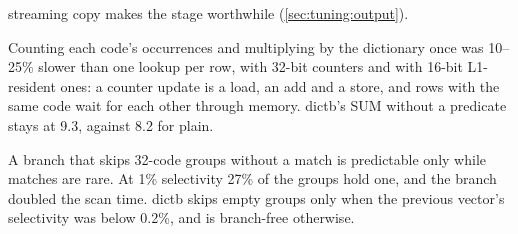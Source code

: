 \begin{description}
streaming copy makes the stage worthwhile (\cref{sec:tuning:output}).
\item[SUM over dictionary codes by counting.] Counting each code's occurrences and multiplying
by the dictionary once was 10--25\% slower than one lookup per row, with 32-bit counters and
with 16-bit L1-resident ones: a counter update is a load, an add and a store, and rows with the
same code wait for each other through memory. dictb's SUM without a predicate stays at 9.3\ms,
against 8.2\ms{} for plain.
\item[Skipping empty code groups in dictb.] A branch that skips 32-code groups without a match
is predictable only while matches are rare. At 1\% selectivity 27\% of the groups hold one, and
the branch doubled the scan time. dictb skips empty groups only when the previous vector's
selectivity was below 0.2\%, and is branch-free otherwise.
\end{description}
